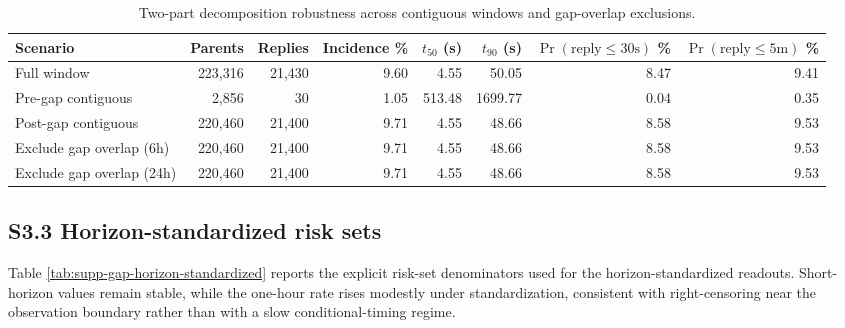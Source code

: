\begin{table}[h]
\centering
\caption{Two-part decomposition robustness across contiguous windows and
gap-overlap exclusions.}
\label{tab:supp-gap-window-robustness}
\scriptsize
\begin{tabular}{@{}lrrrrrrr@{}}
\toprule
\textbf{Scenario} & \textbf{Parents} & \textbf{Replies} & \textbf{Incidence \%} & \textbf{\(t_{50}\) (s)} & \textbf{\(t_{90}\) (s)} & \textbf{\(\Pr(\mathrm{reply}\le 30\mathrm{s})\) \%} & \textbf{\(\Pr(\mathrm{reply}\le 5\mathrm{m})\) \%} \\
\midrule
Full window & 223,316 & 21,430 & 9.60 & 4.55 & 50.05 & 8.47 & 9.41 \\
Pre-gap contiguous & 2,856 & 30 & 1.05 & 513.48 & 1699.77 & 0.04 & 0.35 \\
Post-gap contiguous & 220,460 & 21,400 & 9.71 & 4.55 & 48.66 & 8.58 & 9.53 \\
Exclude gap overlap (6h) & 220,460 & 21,400 & 9.71 & 4.55 & 48.66 & 8.58 & 9.53 \\
Exclude gap overlap (24h) & 220,460 & 21,400 & 9.71 & 4.55 & 48.66 & 8.58 & 9.53 \\
\bottomrule
\end{tabular}
\end{table}

\subsection*{S3.3 Horizon-standardized risk sets}

Table \ref{tab:supp-gap-horizon-standardized} reports the explicit risk-set
denominators used for the horizon-standardized readouts. Short-horizon values
remain stable, while the one-hour rate rises modestly under standardization,
consistent with right-censoring near the observation boundary rather than with a
slow conditional-timing regime.

